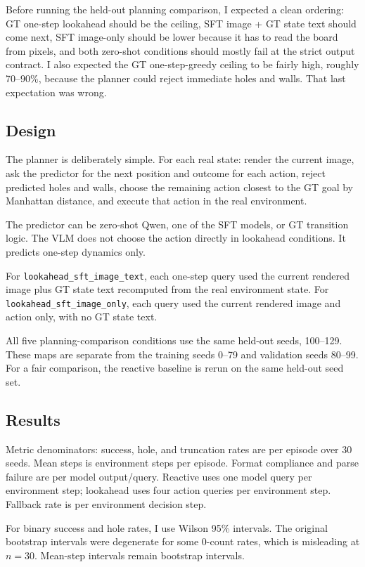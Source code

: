 \documentclass{article}
\newcommand{\code}[1]{\texttt{#1}}
\begin{document}
Before running the held-out planning comparison, I expected a clean ordering: GT one-step lookahead should be the ceiling, SFT image + GT state text should come next, SFT image-only should be lower because it has to read the board from pixels, and both zero-shot conditions should mostly fail at the strict output contract. I also expected the GT one-step-greedy ceiling to be fairly high, roughly 70--90\%, because the planner could reject immediate holes and walls. That last expectation was wrong.

\subsection{Design}

The planner is deliberately simple. For each real state: render the current image, ask the predictor for the next position and outcome for each action, reject predicted holes and walls, choose the remaining action closest to the GT goal by Manhattan distance, and execute that action in the real environment.

The predictor can be zero-shot Qwen, one of the SFT models, or GT transition logic. The VLM does not choose the action directly in lookahead conditions. It predicts one-step dynamics only.

For \code{lookahead\_sft\_image\_text}, each one-step query used the current rendered image plus GT state text recomputed from the real environment state. For \code{lookahead\_sft\_image\_only}, each query used the current rendered image and action only, with no GT state text.

All five planning-comparison conditions use the same held-out seeds, 100--129. These maps are separate from the training seeds 0--79 and validation seeds 80--99. For a fair comparison, the reactive baseline is rerun on the same held-out seed set.

\subsection{Results}

Metric denominators: success, hole, and truncation rates are per episode over 30 seeds. Mean steps is environment steps per episode. Format compliance and parse failure are per model output/query. Reactive uses one model query per environment step; lookahead uses four action queries per environment step. Fallback rate is per environment decision step.

For binary success and hole rates, I use Wilson 95\% intervals. The original bootstrap intervals were degenerate for some 0-count rates, which is misleading at $n=30$. Mean-step intervals remain bootstrap intervals.
\end{document}

